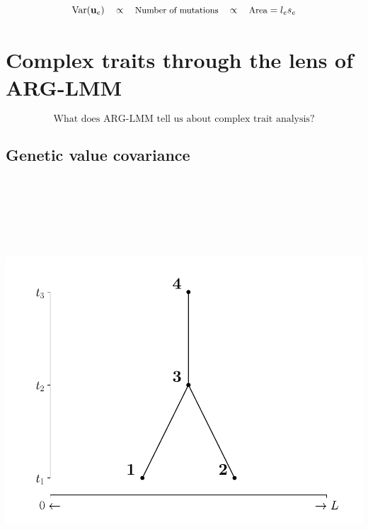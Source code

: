 \documentclass[
  letterpaper,
  DIV=11,
  numbers=noendperiod]{scrartcl}
\begin{document}
\[
\small \mathrm{Var}(\mathbf{u}_e) \quad \propto \quad \text{Number of mutations} \quad \propto \quad \text{Area}=l_es_e
\]

\section{Complex traits through the lens of
ARG-LMM}\label{complex-traits-through-the-lens-of-arg-lmm}

\[
\text{What does ARG-LMM tell us about complex trait analysis?}
\]

\subsection{Genetic value covariance}\label{genetic-value-covariance}

\begin{center}
\includegraphics[width=\linewidth,height=6.25in,keepaspectratio]{slides_files/mediabag/imgs/covariance-0.pdf}
\end{center}
\end{document}
